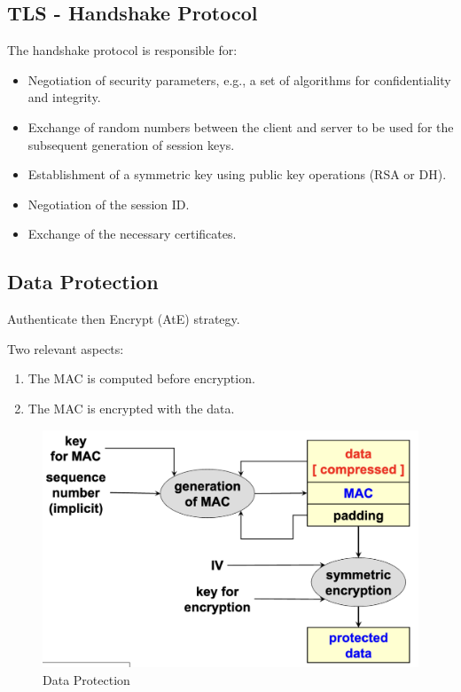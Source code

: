 \subsection{TLS - Handshake Protocol}
The handshake protocol is responsible for:
\begin{itemize}
    \item Negotiation of security parameters, e.g., a set of algorithms for confidentiality and integrity.
    \item Exchange of random numbers between the client and server to be used for the subsequent generation of session keys.
    \item Establishment of a symmetric key using public key operations (RSA or DH).
    \item Negotiation of the session ID.
    \item Exchange of the necessary certificates.
\end{itemize}

\subsection*{Data Protection}
\begin{center}
    Authenticate then Encrypt (AtE) strategy.
\end{center}
\begin{multicols}{2}
    \raggedcolumns
    Two relevant aspects:

    \vspace{1cm}

    \begin{enumerate}
        \item The MAC is computed before encryption.
        \item The MAC is encrypted with the data.
    \end{enumerate}

\columnbreak

    \begin{figure}[H]
        \centering
        \includegraphics[width=\linewidth]{Images/Appsec/data_prot.png}
        \caption{Data Protection}
    \end{figure}
\end{multicols}

